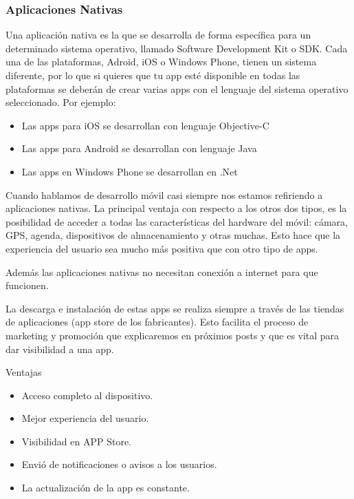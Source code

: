 \subsubsection{Aplicaciones Nativas}
\setlength{\parskip}{5mm}
Una aplicación nativa es la que se desarrolla de forma específica para un determinado  sistema operativo, llamado Software Development Kit o SDK. Cada una de las plataformas, Adroid, iOS o Windows Phone, tienen un sistema diferente, por lo que si quieres que tu app esté disponible en todas las plataformas se deberán de crear varias apps con el lenguaje del sistema operativo seleccionado.
Por ejemplo:
\setlength{\parskip}{0mm}
\begin{itemize}

	\item Las apps para iOS se desarrollan con lenguaje Objective-C
	
	\item Las apps para Android se desarrollan con lenguaje Java
	
	\item Las apps en Windows Phone se desarrollan en .Net

	
\end{itemize}
\setlength{\parskip}{5mm}
Cuando hablamos de desarrollo móvil casi siempre nos estamos refiriendo a aplicaciones nativas. La principal ventaja con respecto a los otros dos tipos, es la posibilidad de acceder a todas las características del hardware del móvil: cámara, GPS, agenda, dispositivos de almacenamiento y otras muchas. Esto hace que la experiencia del usuario sea mucho más positiva que con otro tipo de apps.

Además las aplicaciones nativas no necesitan conexión a internet para que funcionen.

La descarga e instalación de estas apps se realiza siempre a través de las tiendas de aplicaciones (app store de los fabricantes). Esto facilita el proceso de marketing y promoción que explicaremos en próximos posts y que es vital para dar visibilidad a una app.

Ventajas
\setlength{\parskip}{0mm}
\begin{itemize}

	\item Acceso completo al dispositivo. 
	
	\item Mejor experiencia del usuario. 
	
	\item Visibilidad en APP Store.
	
	\item Envió de notificaciones o avisos a los usuarios.
	
	\item La actualización de la app es constante.
	
\end{itemize}

